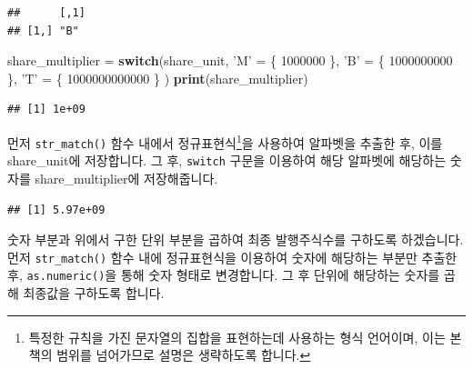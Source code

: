 \documentclass[]{book}
\newenvironment{Shaded}{\begin{snugshade}}{\end{snugshade}}
\newcommand{\ControlFlowTok}[1]{\textcolor[rgb]{0.13,0.29,0.53}{\textbf{#1}}}
\newcommand{\DecValTok}[1]{\textcolor[rgb]{0.00,0.00,0.81}{#1}}
\newcommand{\KeywordTok}[1]{\textcolor[rgb]{0.13,0.29,0.53}{\textbf{#1}}}
\newcommand{\NormalTok}[1]{#1}
\newcommand{\OperatorTok}[1]{\textcolor[rgb]{0.81,0.36,0.00}{\textbf{#1}}}
\newcommand{\StringTok}[1]{\textcolor[rgb]{0.31,0.60,0.02}{#1}}
\let\rmarkdownfootnote\footnote%
\def\footnote{\protect\rmarkdownfootnote}
\begin{document}
\begin{verbatim}
##      [,1]
## [1,] "B"
\end{verbatim}

\begin{Shaded}
\begin{Highlighting}[]
\NormalTok{share_multiplier =}\StringTok{ }\ControlFlowTok{switch}\NormalTok{(share_unit, }
       \StringTok{'M'}\NormalTok{ =}\StringTok{ }\NormalTok{\{ }\DecValTok{1000000}\NormalTok{ \},}
       \StringTok{'B'}\NormalTok{ =}\StringTok{ }\NormalTok{\{ }\DecValTok{1000000000}\NormalTok{ \},}
       \StringTok{'T'}\NormalTok{ =}\StringTok{ }\NormalTok{\{ }\DecValTok{1000000000000}\NormalTok{ \}}
\NormalTok{)}
\KeywordTok{print}\NormalTok{(share_multiplier)}
\end{Highlighting}
\end{Shaded}

\begin{verbatim}
## [1] 1e+09
\end{verbatim}

먼저 \texttt{str\_match()} 함수 내에서 정규표현식\footnote{특정한 규칙을 가진 문자열의 집합을 표현하는데 사용하는 형식 언어이며, 이는 본 책의 범위를 넘어가므로 설명은 생략하도록 합니다.}을 사용하여 알파벳을 추출한 후, 이를 share\_unit에 저장합니다. 그 후, \texttt{switch} 구문을 이용하여 해당 알파벳에 해당하는 숫자를 share\_multiplier에 저장해줍니다.

\begin{Shaded}
\end{Shaded}

\begin{verbatim}
## [1] 5.97e+09
\end{verbatim}

숫자 부분과 위에서 구한 단위 부분을 곱하여 최종 발행주식수를 구하도록 하겠습니다. 먼저 \texttt{str\_match()} 함수 내에 정규표현식을 이용하여 숫자에 해당하는 부분만 추출한 후, \texttt{as.numeric()}을 통해 숫자 형태로 변경합니다. 그 후 단위에 해당하는 숫자를 곱해 최종값을 구하도록 합니다.
\end{document}
